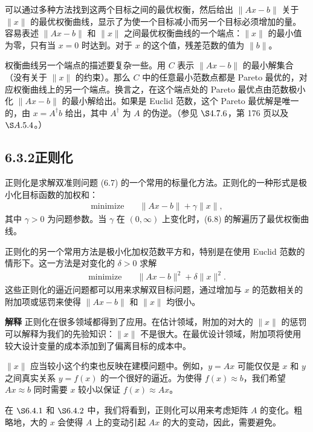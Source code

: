 \documentclass[UTF8, 12pt, fontset=fandol, oneside]{ctexart}
\begin{document}
可以通过多种方法找到这两个目标之间的最优权衡，然后给出 $\|Ax-b\|$ 关于 $\|x\|$ 的最优权衡曲线，显示了为使一个目标减小而另一个目标必须增加的量。容易表述 $\|Ax-b\|$ 和 $\|x\|$ 之间最优权衡曲线的一个端点：$\|x\|$ 的最小值为零，只有当 $x=0$ 时达到。对于 $x$ 的这个值，残差范数的值为 $\|b\|$。

权衡曲线另一个端点的描述要复杂一些。用 $C$ 表示 $\|Ax-b\|$ 的最小解集合（没有关于 $\|x\|$ 的约束）。那么 $C$ 中的任意最小范数点都是 Pareto 最优的，对应权衡曲线上的另一个端点。换言之，在这个端点处的 Pareto 最优点由范数极小化 $\|Ax-b\|$ 的最小解给出。如果是 Euclid 范数，这个 Pareto 最优解是唯一的，由 $x=A^\dagger b$ 给出，其中 $A^\dagger$ 为 $A$ 的伪逆。（参见 $\S 4.7.6$，第 176 页以及 $\S A.5.4$。）

\subsection*{6.3.2\quad 正则化}

正则化是求解双准则问题 (6.7) 的一个常用的标量化方法。正则化的一种形式是极小化目标函数的加权和：
\begin{equation}
\begin{aligned}
\text{minimize}\quad & \|Ax-b\|+\gamma\|x\|,
\end{aligned}
\tag{6.8}
\end{equation}
其中 $\gamma>0$ 为问题参数。当 $\gamma$ 在 $(0,\infty)$ 上变化时，(6.8) 的解遍历了最优权衡曲线。

正则化的另一个常用方法是极小化加权范数平方和，特别是在使用 Euclid 范数的情形下。这一方法是对变化的 $\delta>0$ 求解
\begin{equation}
\begin{aligned}
\text{minimize}\quad & \|Ax-b\|^2+\delta\|x\|^2.
\end{aligned}
\tag{6.9}
\end{equation}
这些正则化的逼近问题都可以用来求解双目标问题，通过增加与 $x$ 的范数相关的附加项或惩罚来使得 $\|Ax-b\|$ 和 $\|x\|$ 均很小。

\noindent\textbf{解释}\quad
正则化在很多领域都得到了应用。在估计领域，附加的对大的 $\|x\|$ 的惩罚可以解释为我们的先验知识：$\|x\|$ 不是很大。在最优设计领域，附加项将使用较大设计变量的成本添加到了偏离目标的成本中。

$\|x\|$ 应当较小这个约束也反映在建模问题中。例如，$y=Ax$ 可能仅仅是 $x$ 和 $y$ 之间真实关系 $y=f(x)$ 的一个很好的逼近。为使得 $f(x)\approx b$，我们希望 $Ax\approx b$ 同时需要 $x$ 较小以保证 $f(x)\approx Ax$。

在 $\S 6.4.1$ 和 $\S 6.4.2$ 中，我们将看到，正则化可以用来考虑矩阵 $A$ 的变化。粗略地，大的 $x$ 会使得 $A$ 上的变动引起 $Ax$ 的大的变动，因此，需要避免。
\end{document}
